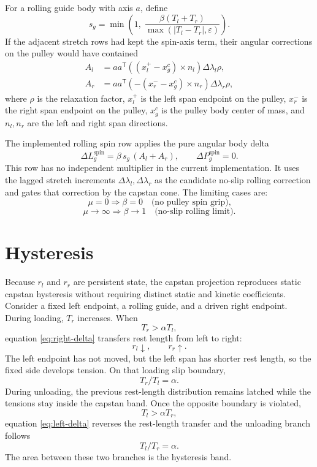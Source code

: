\documentclass[11pt]{article}
\newcommand{\dd}{\Delta}
\newcommand{\eps}{\varepsilon}
\newcommand{\T}{\mathsf{T}}
\begin{document}
For a rolling guide body with axis $a$, define
\begin{equation}
  s_g =
  \min\left(
    1,\;
    \frac{\beta(T_l+T_r)}{\max(|T_l-T_r|,\eps)}
  \right).
  \label{eq:spin-scale}
\end{equation}
If the adjacent stretch rows had kept the spin-axis term, their angular
corrections on the pulley would have contained
\begin{align}
  A_l &= a a^\T \left((x_l^+-x_g^c)\times n_l\right)
        \dd\lambda_l \rho,\\
  A_r &= a a^\T \left(-(x_r^--x_g^c)\times n_r\right)
        \dd\lambda_r \rho,
  \label{eq:spin-candidates}
\end{align}
where $\rho$ is the relaxation factor, $x_l^+$ is the left span endpoint on the
pulley, $x_r^-$ is the right span endpoint on the pulley, $x_g^c$ is the pulley
body center of mass, and $n_l,n_r$ are the left and right span directions.

The implemented rolling spin row applies the pure angular body delta
\begin{equation}
  \dd L_g^\mathrm{spin}
  =
  \beta\,s_g\,(A_l+A_r),
  \qquad
  \dd P_g^\mathrm{spin}=0.
  \label{eq:spin-row}
\end{equation}
This row has no independent multiplier in the current implementation.  It uses
the lagged stretch increments $\dd\lambda_l,\dd\lambda_r$ as the candidate
no-slip rolling correction and gates that correction by the capstan cone.  The
limiting cases are:
\[
  \mu=0 \Rightarrow \beta=0 \quad\text{(no pulley spin grip),}
\]
\[
  \mu\to\infty \Rightarrow \beta\to 1 \quad\text{(no-slip rolling limit).}
\]

\section{Hysteresis}

Because $r_l$ and $r_r$ are persistent state, the capstan projection reproduces
static capstan hysteresis without requiring distinct static and kinetic
coefficients.  Consider a fixed left endpoint, a rolling guide, and a driven
right endpoint.  During loading, $T_r$ increases.  When
\[
  T_r>\alpha T_l,
\]
equation \eqref{eq:right-delta} transfers rest length from left to right:
\[
  r_l\downarrow,\qquad r_r\uparrow.
\]
The left endpoint has not moved, but the left span has shorter rest length, so
the fixed side develops tension.  On that loading slip boundary,
\[
  T_r/T_l=\alpha.
\]
During unloading, the previous rest-length distribution remains latched while
the tensions stay inside the capstan band.  Once the opposite boundary is
violated,
\[
  T_l>\alpha T_r,
\]
equation \eqref{eq:left-delta} reverses the rest-length transfer and the
unloading branch follows
\[
  T_l/T_r=\alpha.
\]
The area between these two branches is the hysteresis band.
\end{document}
